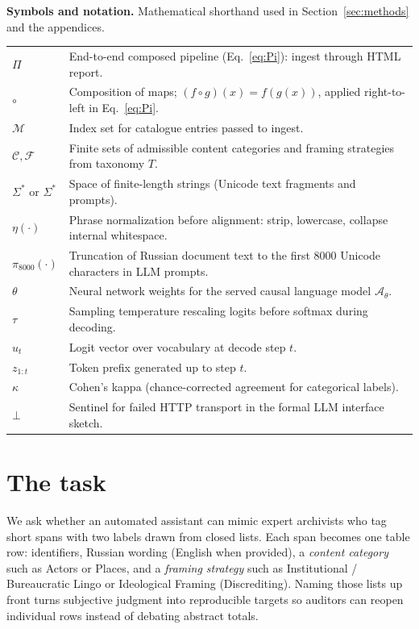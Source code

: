 \documentclass[11pt,a4paper]{article}
\theoremstyle{remark}
\newcommand{\Sig}{\Sigma^\ast}
\begin{document}
\vspace{1.5ex}
\noindent\textbf{Symbols and notation.}\quad
Mathematical shorthand used in Section~\ref{sec:methods} and the appendices.

\begin{tabular}{@{}p{2.6cm}p{11.2cm}@{}}
$\Pi$ & End-to-end composed pipeline (Eq.~\eqref{eq:Pi}): ingest through HTML report. \\
$\circ$ & Composition of maps; $(f\circ g)(x)=f(g(x))$, applied right-to-left in Eq.~\eqref{eq:Pi}. \\
$\mathcal{M}$ & Index set for catalogue entries passed to ingest. \\
$\mathcal{C},\mathcal{F}$ & Finite sets of admissible content categories and framing strategies from taxonomy $T$. \\
$\Sig$ or $\Sigma^\ast$ & Space of finite-length strings (Unicode text fragments and prompts). \\
$\eta(\cdot)$ & Phrase normalization before alignment: strip, lowercase, collapse internal whitespace. \\
$\pi_{8000}(\cdot)$ & Truncation of Russian document text to the first 8000 Unicode characters in LLM prompts. \\
$\theta$ & Neural network weights for the served causal language model $\mathcal{A}_\theta$. \\
$\tau$ & Sampling temperature rescaling logits before softmax during decoding. \\
$u_t$ & Logit vector over vocabulary at decode step $t$. \\
$z_{1:t}$ & Token prefix generated up to step $t$. \\
$\kappa$ & Cohen's kappa (chance-corrected agreement for categorical labels). \\
$\bot$ & Sentinel for failed HTTP transport in the formal LLM interface sketch. \\
\end{tabular}

\newpage

\section{The task}
\label{sec:task}

We ask whether an automated assistant can mimic expert archivists who tag short spans with two labels drawn from closed lists. Each span becomes one table row: identifiers, Russian wording (English when provided), a \emph{content category} such as Actors or Places, and a \emph{framing strategy} such as Institutional / Bureaucratic Lingo or Ideological Framing (Discrediting). Naming those lists up front turns subjective judgment into reproducible targets so auditors can reopen individual rows instead of debating abstract totals.
\end{document}
